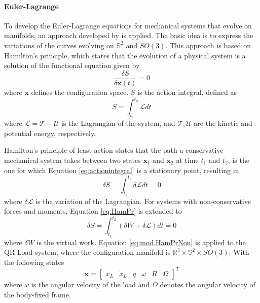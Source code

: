 \paragraph{Euler-Lagrange} To develop the Euler-Lagrange equations for mechanical systems that evolve on manifolds, an approach developed by \cite{Lee2008,Lee2005,Lee2009,Lee2011} is applied. 
The basic idea is to express the variations of the curves evolving on $ \mathbb{S}^2 $ and $ SO(3) $. 
This approach is based on Hamilton's principle, which states that the evolution of a physical system is a solution of the functional equation given by
\begin{equation}\label{key}
\frac{\delta S}{\delta \mathbf{x}(t)}=0
\end{equation}
where $ \mathbf{x} $ defines the configuration space. $ S $ is the action integral, defined as
\begin{equation}\label{eq:actionintegral}
S=\int_{t_1}^{t_2}\mathcal{L}dt
\end{equation}
where $\mathcal{L}=\mathcal{T}-\mathcal{U} $ is the Lagrangian of the system, and $\mathcal{T},\mathcal{U}$ are the kinetic and potential energy, respectively. 

Hamilton's principle of least action states that the path a conservative mechanical system takes between two states $ \mathbf{x}_1 $ and $ \mathbf{x}_2 $ at time $ t_1 $ and $ t_2 $, is the one for which Equation \ref{eq:actionintegral} is a stationary point, resulting in
\begin{equation}\label{eq:HamPr}
\delta S=\int_{t_1}^{t_2}\delta\mathcal{L}dt=0
\end{equation}
where $ \delta\mathcal{L} $ is the variation of the Lagrangian. For systems with non-conservative forces and moments, Equation \ref{eq:HamPr} is extended to
\begin{equation}\label{eq:mod.HamPrNon}
\delta S=\int_{t_1}^{t_2}(\delta W+\delta\mathcal{L})dt=0
\end{equation}
where $ \delta W $ is the virtual work. Equation \ref{eq:mod.HamPrNon} is applied to the QR-Load system, where the configuration manifold is $ \mathbb{R}^3\times \mathbb{S}^2\times SO(3) $. With the following states
\begin{equation}
\textbf{x}= \begin{bmatrix}x_L& \dot{x}_L& q& \omega&R&\Omega
\end{bmatrix}^T
\end{equation}
where $ \omega $ is the angular velocity of the load and $ \Omega $ denotes the angular velocity of the body-fixed frame. 

